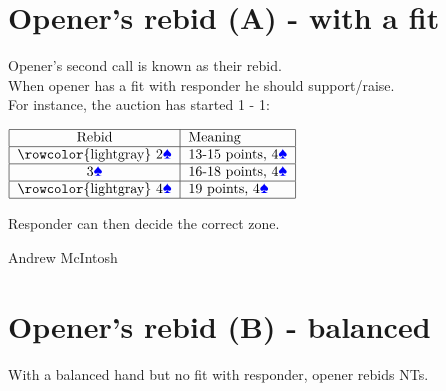 \documentclass[14pt]{extarticle}
\begin{document}
\addtocounter{page}{16} 
\newpage

\vspace*{\fill}
\begingroup
\centering
\section*{Opener's rebid (A) - with a fit}

\endgroup
\noindent Opener's second call is known as their rebid.\\
\noindent When opener has a fit with responder he should support/raise.\\

\noindent For instance, the auction has started 1\textcolor{red}{} - 1\textcolor{blue}{}:\\
\begin{center}
$\begin{tabular}{|c|l|}
\hline
Rebid & Meaning\\
\hline
\rowcolor{lightgray}
2\textcolor{blue}{\ding{171}} & 13-15 points, 4\textcolor{blue}{\ding{171}}\\
\hline
3\textcolor{blue}{\ding{171}} &  16-18 points, 4\textcolor{blue}{\ding{171}}\\
\hline
\rowcolor{lightgray}
4\textcolor{blue}{\ding{171}} &  19 points, 4\textcolor{blue}{\ding{171}}\\
\hline\end{tabular}$\\\end{center}
\vspace{0.15in}
\noindent Responder can then decide the correct zone.

\vspace*{\fill}
\begin{flushbottom}
 \begin{center}
 \tiny
 \textcopyright Andrew McIntosh
\end{center}
\end{flushbottom}


\newpage

\vspace*{\fill}
\begingroup
\centering

\section*{Opener's rebid (B) - balanced}
\endgroup
\noindent With a balanced hand but no fit with responder, opener rebids NTs.\\
% 
% 
\end{document}

